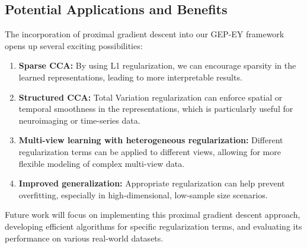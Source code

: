 \subsection{Potential Applications and Benefits}

The incorporation of proximal gradient descent into our GEP-EY framework opens up several exciting possibilities:

\begin{enumerate}
    \item \textbf{Sparse CCA:} By using L1 regularization, we can encourage sparsity in the learned representations, leading to more interpretable results.
    \item \textbf{Structured CCA:} Total Variation regularization can enforce spatial or temporal smoothness in the representations, which is particularly useful for neuroimaging or time-series data.
    \item \textbf{Multi-view learning with heterogeneous regularization:} Different regularization terms can be applied to different views, allowing for more flexible modeling of complex multi-view data.
    \item \textbf{Improved generalization:} Appropriate regularization can help prevent overfitting, especially in high-dimensional, low-sample size scenarios.
\end{enumerate}

Future work will focus on implementing this proximal gradient descent approach, developing efficient algorithms for specific regularization terms, and evaluating its performance on various real-world datasets.




